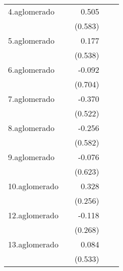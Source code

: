 {\begin{longtable}{l*{4}{D{.}{.}{-1}}}
\addlinespace
4.aglomerado&                     &       0.505         &                     &                     \\
            &                     &     (0.583)         &                     &                     \\
\addlinespace
5.aglomerado&                     &       0.177         &                     &                     \\
            &                     &     (0.538)         &                     &                     \\
\addlinespace
6.aglomerado&                     &      -0.092         &                     &                     \\
            &                     &     (0.704)         &                     &                     \\
\addlinespace
7.aglomerado&                     &      -0.370         &                     &                     \\
            &                     &     (0.522)         &                     &                     \\
\addlinespace
8.aglomerado&                     &      -0.256         &                     &                     \\
            &                     &     (0.582)         &                     &                     \\
\addlinespace
9.aglomerado&                     &      -0.076         &                     &                     \\
            &                     &     (0.623)         &                     &                     \\
\addlinespace
10.aglomerado&                     &       0.328         &                     &                     \\
            &                     &     (0.256)         &                     &                     \\
\addlinespace
12.aglomerado&                     &      -0.118         &                     &                     \\
            &                     &     (0.268)         &                     &                     \\
\addlinespace
13.aglomerado&                     &       0.084         &                     &                     \\
            &                     &     (0.533)         &                     &                     \\

\end{longtable}}

